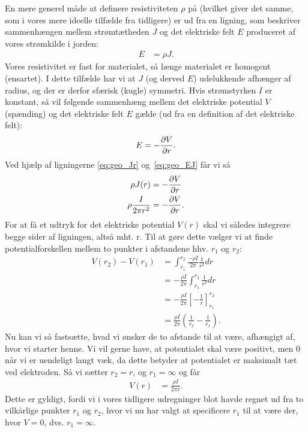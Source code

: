 %
En mere generel måde at definere resistiviteten $\rho $ på (hvilket giver det samme, som i vores mere ideelle tilfælde fra tidligere) er ud fra en ligning, som beskriver sammenhængen mellem strømtætheden $J$ og det elektriske felt $E$ produceret af vores strømkilde i jorden:
\begin{align}\label{eq:geo_EJ}
    E &= \rho J.
\end{align}
Vores resistivitet er fast for materialet, så længe materialet er homogent (ensartet). I dette tilfælde har vi at $J$ (og derved $E$) udelukkende afhænger af radius, og der er derfor sfærisk (kugle) symmetri. Hvis strømstyrken $I$ er konstant, så vil følgende sammenhæng mellem det elektriske potential $V$ (spænding) og det elektriske felt $E$ gælde (ud fra en definition af det elektriske felt):
\begin{align}
    E = - \pdv{V}{r}.
\end{align}
Ved hjælp af ligningerne \eqref{eq:geo_Jr} og~\eqref{eq:geo_EJ} får vi så
\begin{align}
    \rho J(r) &= - \pdv{V}{r} \\
    \rho \frac{I}{2\pi r^2} &= - \pdv{V}{r}.
\end{align}
For at få et udtryk for det elektriske potential $V(r)$ skal vi således integrere begge sider af ligningen, altså mht. r. Til at gøre dette vælger vi at finde potentialforskellen mellem to punkter i afstandene hhv. $r_1$ og $r_2$:
\begin{align}
    V(r_2) - V(r_1) &= \int_{r_1}^{r_2} \frac{-\rho I}{2\pi} \frac{1}{r^2} dr \\ \nonumber
                    &= -\frac{\rho I}{2\pi} \int_{r_1}^{r_2} \frac{1}{r^2} dr \\ \nonumber
                    &= -\frac{\rho I}{2\pi} \left[-\frac{1}{r}\right]_{r_1} ^{r_2} \\ \nonumber
                    &= \frac{\rho I}{2\pi} \left(\frac{1}{r_2} - \frac{1}{r_1}\right).
\end{align}
Nu kan vi så fastsætte, hvad vi ønsker de to afstande til at være, afhængigt af, hvor vi starter henne. Vi vil gerne have, at potentialet skal være positivt, men 0 når vi er uendeligt langt væk, da dette betyder at potentialet er maksimalt tæt ved elektroden. Så vi sætter $r_2 = r$, og $r_1 = \infty$ og får
\begin{align}\label{lign:geo_potentiale}
    V(r) &= \frac{\rho I}{2\pi r}.
\end{align}
Dette er gyldigt, fordi vi i vores tidligere udregninger blot havde regnet ud fra to vilkårlige punkter $r_1$ og $r_2$, hvor vi nu har valgt at specificere $r_1$ til at være der, hvor $V = 0$, dvs. $r_1 = \infty$. \\
